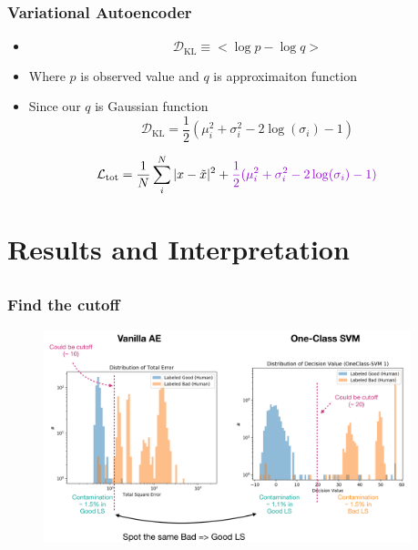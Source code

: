 \documentclass{beamer}
\begin{document}
\begin{frame}
\frametitle{Variational Autoencoder}
\begin{theorem}
\begin{itemize}
    \item {}
    \begin{equation}
        \mathcal{D}_{\text{KL}} \equiv < \log p - \log q >
    \end{equation}
    \item Where $p$ is observed value and $q$ is approximaiton function
    \item Since our $q$ is Gaussian function
    \begin{equation}
        \mathcal{D}_{\text{KL}} = \frac{1}{2}(\mu_i^2 +\sigma_i^2 - 2\log(\sigma_i) - 1)
    \end{equation}
\end{itemize}
\end{theorem}
\begin{equation}
    \mathcal{L}_{\text{tot}} = \frac{1}{N}\sum_i^N |x-\tilde{x}|^2 + \textcolor[RGB]{148,0,211}{\frac{1}{2}(\mu_i^2 +\sigma_i^2 - 2\log(\sigma_i) - 1)}
\end{equation}
\end{frame}

\section{Results and Interpretation}
\subsection{}

\begin{frame}
\frametitle{Find the cutoff}
\begin{figure}
    \includegraphics[height=0.8\textheight, width=0.95\textwidth]{images/decision_value_dist}
\end{figure}
\end{frame}
\end{document}
